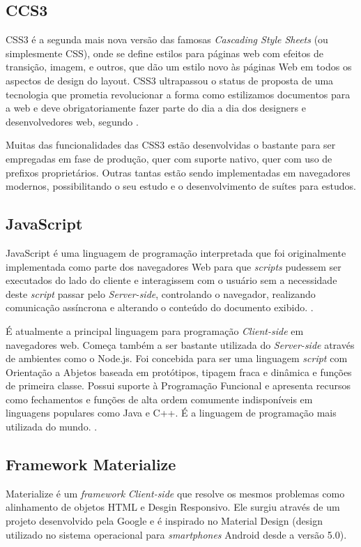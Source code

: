 \subsection{CCS3}
CSS3 é a segunda mais nova versão das famosas \textit{Cascading Style Sheets} (ou simplesmente CSS), onde se define estilos para páginas web com efeitos de transição, imagem, e outros, que dão um estilo novo às páginas Web em todos os aspectos de design do layout. CSS3 ultrapassou o status de proposta de uma tecnologia que prometia revolucionar a forma como estilizamos documentos para a web e deve obrigatoriamente fazer parte do dia a dia dos designers e desenvolvedores web, segundo .

Muitas das funcionalidades das CSS3 estão desenvolvidas o bastante para ser empregadas em fase de produção, quer com suporte nativo, quer com uso de prefixos proprietários. Outras tantas estão sendo implementadas em navegadores modernos, possibilitando o seu estudo e o desenvolvimento de suítes para estudos.

\subsection{JavaScript}
JavaScript é uma linguagem de programação interpretada que foi originalmente implementada como parte dos navegadores Web para que \textit{scripts} pudessem ser executados do lado do cliente e interagissem com o usuário sem a necessidade deste \textit{script} passar pelo \textit{Server-side}, controlando o navegador, realizando comunicação assíncrona e alterando o conteúdo do documento exibido. \cite{flanagan2007javascript-UPPERCASE}.

É atualmente a principal linguagem para programação \textit{Client-side} em navegadores web. Começa também a ser bastante utilizada do \textit{Server-side} através de ambientes como o Node.js. Foi concebida para ser uma linguagem \textit{script} com Orientação a Abjetos baseada em protótipos, tipagem fraca e dinâmica e funções de primeira classe. Possui suporte à Programação Funcional e apresenta recursos como fechamentos e funções de alta ordem comumente indisponíveis em linguagens populares como Java e C++. É a linguagem de programação mais utilizada do mundo. \cite{flanagan2007javascript-UPPERCASE}.

\subsection{Framework Materialize}
Materialize é um \textit{framework} \textit{Client-side} que resolve os mesmos problemas como alinhamento de objetos HTML e Desgin Responsivo. Ele surgiu através de um projeto desenvolvido pela Google e é inspirado no Material Design (design utilizado no sistema operacional para \textit{smartphones} Android desde a versão 5.0).

